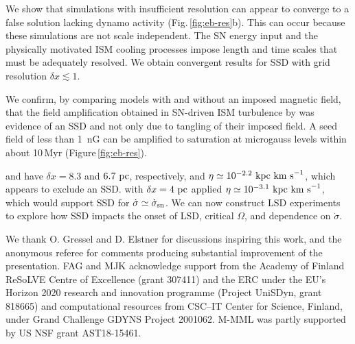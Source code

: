 \documentclass[preprint2]{aastex63}
\newcommand\SNr{\dot\sigma_{\rm sn}}
\newcommand\kpc{~ {\rm kpc}}
\newcommand\pc{~ {\rm pc}}
\newcommand\dx{ {\delta x}}
\newcommand\kms{~ {\rm km~ s}^{-1}}
\begin{document}
 We show that simulations with insufficient resolution can appear to
 converge to a false solution lacking dynamo activity
 (Fig.\,\ref{fig:eb-res}b). This can occur because these simulations are not
 scale independent. 
 The SN energy input and the physically motivated ISM cooling processes impose
 length and time scales that must be adequately resolved.
 {We obtain convergent results for SSD with grid resolution
 $\dx\lesssim1$.}

{We confirm,
  by comparing models with and without an imposed magnetic field,
 that the field amplification obtained in SN-driven ISM turbulence by
 \citet{BKMM04}
 was evidence of an SSD and not only due to tangling of their imposed field.}
 A seed field of less than 1~nG can be amplified to saturation at microgauss
 levels within about 10\,Myr (Figure\,\ref{fig:eb-res}). 

 \citet{Gressel:2008} and \citet{GE20} have $\dx=8.3$ and $6.7\pc$,
 respectively, and $\eta\simeq10^{-2.2}\kpc\kms$, which appears to exclude
 an SSD.
 \citet{Gent:2013a} with $\dx=4\pc$ applied $\eta\simeq10^{-3.1}\kpc\kms$,
 which would support SSD for $\dot\sigma\simeq\SNr$.
 {We can now construct LSD experiments to explore how SSD impacts the 
onset of LSD, critical $\Omega$, and dependence on $\dot\sigma$.}   

\acknowledgments
 {We thank O. Gressel and D. Elstner for discussions inspiring this work,
 and the anonymous referee for comments producing substantial improvement of
 the presentation.}
 FAG and MJK acknowledge support from the Academy of Finland
 ReSoLVE Centre of Excellence (grant 307411) and the ERC
 under the EU's Horizon 2020 research and innovation
 programme (Project UniSDyn, grant 818665) and computational
 resources from CSC–IT Center for Science, Finland, under Grand
 Challenge GDYNS Project 2001062. 
 M-MML was partly supported by US NSF grant AST18-15461.

\end{document}
